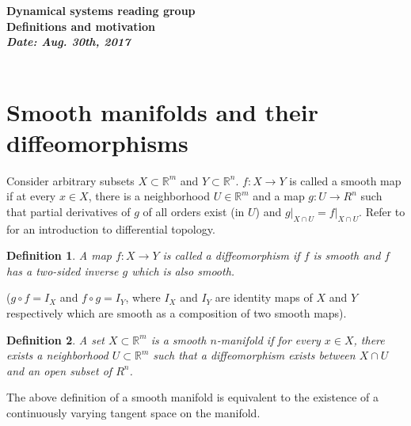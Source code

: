 \documentclass[11pt]{article}
\newtheorem{definition}{Definition}
\begin{document}
\begin{center}
{\large \bf	Dynamical systems reading group \\[1ex]
			Definitions and motivation
\\[2ex]
	   	{\it Date: Aug. 30th, 2017} \hfill \\[-1.5ex]	  
 	\hrulefill \\
				
}
\end{center}


\section*{Smooth manifolds and their diffeomorphisms}

Consider arbitrary subsets $X \subset \mathbb{R}^m$ and $Y \subset \mathbb{R}^n$. $f:X\to Y$ is called a smooth map if at every $x \in X$, there is a 
neighborhood $U \in \mathbb{R}^m$ and a map $g:U\to R^n$ such that 
partial derivatives of $g$ of all orders exist (in $U$) and $g\bigg|_{X \cap
U} = f\bigg|_{X \cap U}$. Refer to \cite{milnor,milnor2011} for an introduction 
to differential topology.

\begin{definition}
A map $f:X\to Y$ is called a diffeomorphism if $f$ is smooth and 
$f$ has a two-sided inverse $g$ which is also smooth.\end{definition} 

 ($g\circ f = I_X$
and $f\circ g = I_Y$, where $I_X$ and $I_Y$ are identity maps 
of $X$ and $Y$ respectively which are smooth as a composition of two smooth maps).

\begin{definition}
A set $X \subset \mathbb{R}^m$ is a smooth $n$-manifold if for every $x \in X$, there exists 
a neighborhood $U \subset \mathbb{R}^m$ such that a diffeomorphism exists
between $X \cap U$ and an open subset of $R^n$.
\end{definition} 

The above definition of a smooth manifold is equivalent to the existence of a
continuously varying tangent space on the manifold. 
\end{document}
